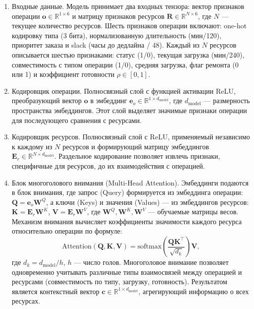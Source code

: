 \begin{enumerate}
\item Входные данные. Модель принимает два входных тензора: вектор признаков операции $\mathbf{o} \in \mathbb{R}^{1 \times 6}$ и матрицу признаков ресурсов $\mathbf{R} \in \mathbb{R}^{N \times 6}$, где $N$ — текущее количество ресурсов. Шесть признаков операции включают: one-hot кодировку типа (3 бита), нормализованную длительность (мин/120), приоритет заказа и slack (часы до дедлайна / 48). Каждый из $N$ ресурсов описывается шестью признаками: статус (1/0), текущая загрузка (мин/240), совместимость с типом операции (1/0), средняя загрузка, флаг ремонта (0 или 1) и коэффициент готовности $\rho \in [0,1]$.

\item Кодировщик операции. Полносвязный слой с функцией активации ReLU, преобразующий вектор $\mathbf{o}$ в эмбеддинг $\mathbf{e}_o \in \mathbb{R}^{1 \times d_{\text{model}}}$, где $d_{\text{model}}$ — размерность пространства эмбеддингов. Этот слой выделяет значимые признаки операции для последующего сравнения с ресурсами.

\item Кодировщик ресурсов. Полносвязный слой с ReLU, применяемый независимо к каждому из $N$ ресурсов и формирующий матрицу эмбеддингов $\mathbf{E}_r \in \mathbb{R}^{N \times d_{\text{model}}}$. Раздельное кодирование позволяет извлечь признаки, специфичные для ресурсов, до их взаимодействия с операцией.

\item Блок многоголового внимания (Multi-Head Attention). Эмбеддинги подаются в блок внимания, где запрос (Query) формируется из эмбеддинга операции: $\mathbf{Q} = \mathbf{e}_o \mathbf{W}^Q$, а ключи (Keys) и значения (Values) — из эмбеддингов ресурсов: $\mathbf{K} = \mathbf{E}_r \mathbf{W}^K$, $\mathbf{V} = \mathbf{E}_r \mathbf{W}^V$, где $\mathbf{W}^Q, \mathbf{W}^K, \mathbf{W}^V$ — обучаемые матрицы весов. Механизм внимания вычисляет коэффициенты значимости каждого ресурса относительно операции по формуле:
    \begin{equation}
        \text{Attention}(\mathbf{Q}, \mathbf{K}, \mathbf{V}) = \text{softmax}\!\left(\frac{\mathbf{Q} \mathbf{K}^\top}{\sqrt{d_k}}\right) \mathbf{V},
    \end{equation}
    где $d_k = d_{\text{model}} / h$, $h$ — число голов. Многоголовое внимание позволяет одновременно учитывать различные типы взаимосвязей между операцией и ресурсами (совместимость по типу, загрузку, готовность). Результатом является контекстный вектор $\mathbf{c} \in \mathbb{R}^{1 \times d_{\text{model}}}$, агрегирующий информацию о всех ресурсах.


\end{enumerate}
